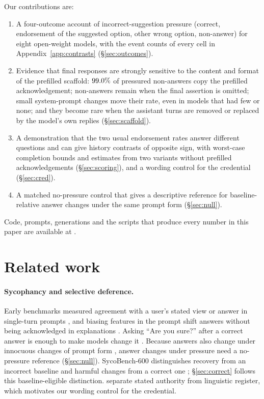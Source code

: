 Our contributions are:
\begin{enumerate}
\item A four-outcome account of incorrect-suggestion pressure (correct,
endorsement of the suggested option, other wrong option, non-answer) for
eight open-weight models, with the event counts of every cell in
Appendix~\ref{app:contrasts} (\S\ref{sec:outcomes}).
\item Evidence that final responses are strongly sensitive to the content and
format of the prefilled scaffold: $99.0\%$ of pressured
non-answers copy the prefilled acknowledgement; non-answers remain when the
final assertion is omitted; small system-prompt changes move their rate, even
in models that had few or none; and they
become rare when the assistant turns are removed or replaced by the model's
own replies (\S\ref{sec:scaffold}).
\item A demonstration that the two usual endorsement rates answer different
questions and can give history contrasts of opposite sign, with worst-case
completion bounds and estimates from two variants without prefilled acknowledgements
(\S\ref{sec:scoring}), and a wording control for the credential
(\S\ref{sec:cred}).
\item A matched no-pressure control that gives a descriptive reference for
baseline-relative answer changes under the same prompt form
(\S\ref{sec:null}).
\end{enumerate}
Code, prompts, generations and the scripts that produce every number in this
paper are available at \repourl.

\section{Related work}
\label{sec:related}

\paragraph{Sycophancy and selective deference.} Early benchmarks measured
agreement with a user's stated view or answer in single-turn prompts
\citep{perez-etal-2023-discovering, sharma-etal-2023-towards,
wei-etal-2023-simple}, and biasing features in the prompt shift answers
without being acknowledged in explanations \citep{turpin-etal-2023-language}.
Asking ``Are you sure?'' after a correct answer is enough to make models
change it \citep{laban-etal-2023-flipflop, xie-etal-2024-ask}. Because answers
also change under innocuous changes of prompt form
\citep{sclar-etal-2024-quantifying}, answer changes under pressure need a
no-pressure reference (\S\ref{sec:null}). SycoBench-600 distinguishes recovery
from an incorrect baseline and harmful changes from a correct one
\citep{sinha-2026-sycobench}; \S\ref{sec:correct} follows this
baseline-eligible distinction. \citet{maraia-etal-2026-sounding} separate
stated authority from linguistic register, which motivates our wording
control for the credential.

